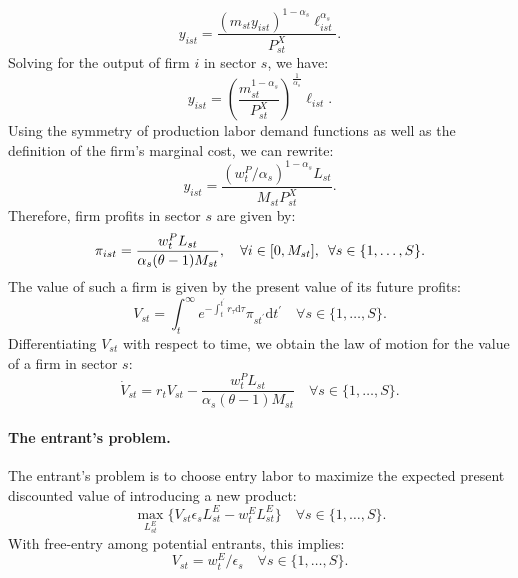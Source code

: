 \documentclass[12pt]{article}
\newcommand{\smallquad}{\hspace{0.5em}}
\begin{document}
\begin{equation*}
    y_{ist} = \frac{(m_{st} y_{ist})^{1 - \alpha_s} \ell_{ist}^{\alpha_s}}{P_{st}^X}.
\end{equation*}
Solving for the output of firm $i$ in sector $s$, we have:
\begin{equation*}
    y_{ist} = \left(\frac{m_{st}^{1 - \alpha_s}}{P_{st}^X}\right)^{\frac{1}{\alpha_s}} \ell_{ist}.
\end{equation*}
Using the symmetry of production labor demand functions as well as the definition of the firm's marginal cost, we can rewrite:
\begin{equation*}
    y_{ist} = \frac{(w_t^P / \alpha_s)^{1 - \alpha_s} L_{st}}{M_{st} P_{st}^X}.
\end{equation*}
Therefore, firm profits in sector $s$ are given by:
\begin{equation*}
    \pi_{ist} = \frac{w_t^P L_{st}}{\alpha_s (\theta - 1) M_{st}}, \quad \forall i \in [0, M_{st}], \smallquad \forall s \in \{1, \ldots, S\}.
\end{equation*}
The value of such a firm is given by the present value of its future profits:
\begin{equation*}
    V_{st} = \int_t^{\infty} e^{-\int_t^{t^{\prime}} r_{\tau} \text{d}\tau} \pi_{st^{\prime}} \text{d}t^{\prime} \quad \forall s \in \{1, \ldots, S\}.
\end{equation*}
Differentiating $V_{st}$ with respect to time, we obtain the law of motion for the value of a firm in sector $s$:
\begin{equation*}
    \dot{V}_{st} = r_t V_{st} - \frac{w_t^P L_{st}}{\alpha_s (\theta - 1) M_{st}} \quad \forall s \in \{1, \ldots, S\}.
\end{equation*}

\paragraph{The entrant's problem.} The entrant's problem is to choose entry labor to maximize the expected present discounted value of introducing a new product:
\begin{equation*}
    \max_{L_{st}^E} \{V_{st} \epsilon_s L_{st}^E - w_t^E L_{st}^E\} \quad \forall s \in \{1, \ldots, S\}.
\end{equation*}
With free-entry among potential entrants, this implies:
\begin{equation*}
    V_{st} = w_t^E / \epsilon_s \quad \forall s \in \{1, \ldots, S\}.
\end{equation*}
\end{document}
